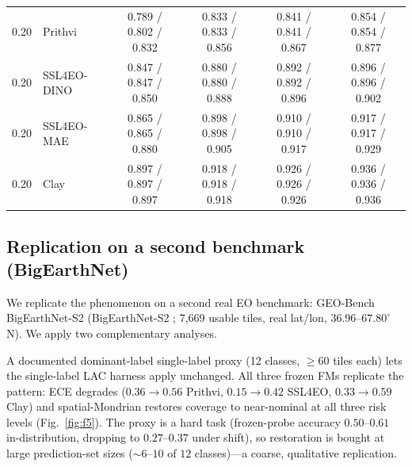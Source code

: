 \documentclass[journal]{IEEEtran}
\renewcommand{\_}{\textunderscore\allowbreak}
\begin{document}
\begin{table}[htbp]
\begin{tabular}{clcccc}
\midrule
0.20 & Prithvi & 0.789 / 0.802 / 0.832\rlap{$^{\dagger}$} & 0.833 / 0.833 / 0.856\rlap{$^{\dagger}$} & 0.841 / 0.841 / 0.867\rlap{$^{\dagger}$} & 0.854 / 0.854 / 0.877\rlap{$^{\dagger}$} \\
0.20 & SSL4EO-DINO & 0.847 / 0.847 / 0.850\rlap{$^{\dagger}$} & 0.880 / 0.880 / 0.888\rlap{$^{\dagger}$} & 0.892 / 0.892 / 0.896\rlap{$^{\dagger}$} & 0.896 / 0.896 / 0.902\rlap{$^{\dagger}$} \\
0.20 & SSL4EO-MAE & 0.865 / 0.865 / 0.880\rlap{$^{\dagger}$} & 0.898 / 0.898 / 0.905\rlap{$^{\dagger}$} & 0.910 / 0.910 / 0.917\rlap{$^{\dagger}$} & 0.917 / 0.917 / 0.929\rlap{$^{\dagger}$} \\
0.20 & Clay & 0.897 / 0.897 / 0.897\rlap{$^{\dagger}$} & 0.918 / 0.918 / 0.918\rlap{$^{\dagger}$} & 0.926 / 0.926 / 0.926\rlap{$^{\dagger}$} & 0.936 / 0.936 / 0.936\rlap{$^{\dagger}$} \\
\bottomrule
\end{tabular}
\end{table}

\subsection{Replication on a second benchmark (BigEarthNet)}
We replicate the phenomenon on a second real EO benchmark: GEO-Bench \citep{lacoste2023geobench} BigEarthNet-S2
(BigEarthNet-S2 \citep{sumbul2019bigearthnet}; 7{,}669 usable tiles, real lat/lon, $36.96$--$67.80^\circ$N). We apply two complementary
analyses.

A documented dominant-label single-label proxy (12 classes, $\ge60$ tiles each)
lets the single-label LAC harness apply unchanged. All three frozen FMs replicate the pattern: ECE degrades
($0.36\to0.56$ Prithvi, $0.15\to0.42$ SSL4EO, $0.33\to0.59$ Clay) and spatial-Mondrian restores coverage
to near-nominal at all three risk levels (Fig.~\ref{fig:f5}). The proxy is a hard task (frozen-probe accuracy $0.50$--$0.61$
in-distribution, dropping to $0.27$--$0.37$ under shift), so restoration is bought at large prediction-set
sizes (${\sim}6$--$10$ of $12$ classes)---a coarse, qualitative replication.
\end{document}
